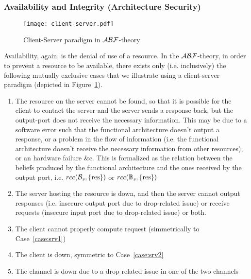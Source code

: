 \subsubsection{Availability and Integrity (Architecture Security)}
\begin{figure}[t]
	\centering
	\texttt{[image: client-server.pdf]}
	\caption{Client-Server paradigm in $\mathcal{A}\mathcal{B}\mathcal{F}$-theory}
	\label{fig:client-server}
\end{figure}
Availability, again, is the denial of use of a resource. In the $\mathcal{A}\mathcal{B}\mathcal{F}$-theory, 
in order to prevent a resource to be available, there
exists only (i.e. inclusively) the following mutually exclusive cases
that we illustrate using a client-server paradigm (depicted in Figure~\ref{fig:client-server}).
\begin{enumerate}
	\item\label{case:srv1} The resource on the server cannot be found, so that it is
		possible for the client to contact the server and the server
		sends a response back, but the output-port does not receive the
		necessary information. This may be due to a software error such
		that the functional architecture doesn't output a response, or
		a problem in the flow of information (i.e. the functional
		architecture doesn't receive the necessary information from
		other resources), or an hardware failure \&c. This is formalized
		as the relation between the beliefs produced by the functional
		architecture and the ones received by the output port, i.e.
		$rcc(\mathcal{B}_s,\{\text{res}\})$ or 
		$rcc(\mathbb{B}_s,\{\text{res}\})$ 
	\item\label{case:srv2} The server hosting the resource is down, and then the server
		cannot output responses (i.e. insecure output port due to drop-related issue) or receive
		requests (insecure input port due to drop-related issue) or both.
	\item\label{case:srv3} The client cannot properly compute request (simmetrically to Case~\ref{case:srv1})
	\item The client is down, symmetric to Case~\ref{case:srv2}
	\item The channel is down due to a drop related issue in one of the two channels 
\end{enumerate}
